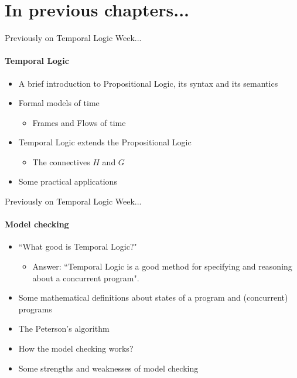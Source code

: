 
\section{In previous chapters...}
\begin{frame}{Previously on Temporal Logic Week...}
  \framesubtitle{Temporal Logic}
  \begin{itemize}
	\item 
	{
		A brief introduction to Propositional Logic, its syntax and its semantics
		\pause
	}
	\item
	{
		Formal models of time
		\pause
		\begin{itemize}
			\item Frames and Flows of time
			\pause
		\end{itemize}
	}
	\item
	{
		Temporal Logic extends the Propositional Logic
		\begin{itemize}
			\item The connectives $H$ and $G$ \pause
		\end{itemize}
	}
	\item
	{
		Some practical applications
	}
  \end{itemize}

\end{frame}


\begin{frame}{Previously on Temporal Logic Week...}
  \framesubtitle{Model checking}
  \begin{itemize}
	  \item
	  {
		  ``What good is Temporal Logic?"
		  \pause
		  \begin{itemize}
			  \item
			  {
				  Answer: ``Temporal Logic is a good method for specifying and reasoning about a concurrent program".
				  \pause
			  }
		  \end{itemize}
	  }
	  \item
	  {
		  Some mathematical definitions about states of a program and (concurrent) programs
		  \pause
	  }
	  \item
	  {
		  The Peterson's algorithm
		  \pause
	  }
	  \item
	  {
		  How the model checking works?
		  \pause
	  }
	  \item
	  {
		  Some strengths and weaknesses of model checking
	  }
  \end{itemize}
\end{frame}
